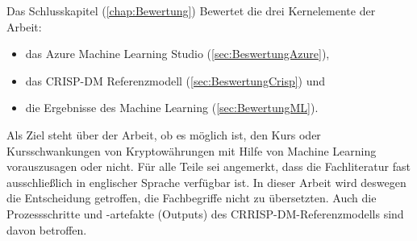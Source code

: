 Das Schlusskapitel (\ref{chap:Bewertung}) Bewertet die drei Kernelemente der Arbeit:
\begin{itemize}
\item das Azure Machine Learning Studio (\ref{sec:BeswertungAzure}),
\item das CRISP-DM Referenzmodell (\ref{sec:BeswertungCrisp}) und
\item die Ergebnisse des Machine Learning (\ref{sec:BewertungML}).
\end{itemize}
Als Ziel steht über der Arbeit, ob es möglich ist, den Kurs oder Kursschwankungen von Kryptowährungen mit Hilfe von Machine Learning vorauszusagen oder nicht.\newline
Für alle Teile sei angemerkt, dass die Fachliteratur fast ausschließlich in englischer Sprache verfügbar ist. In dieser Arbeit wird deswegen die Entscheidung getroffen, die Fachbegriffe nicht zu übersetzten. Auch die Prozessschritte und -artefakte (Outputs) des CRRISP-DM-Referenzmodells sind davon betroffen. 
